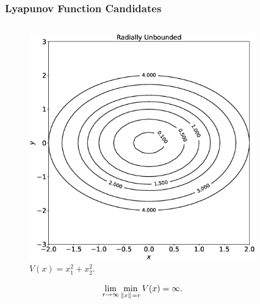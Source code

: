 \begin{frame}
    \frametitle{Lyapunov Function Candidates}

    \begin{columns}
        \begin{column}{0.5\textwidth}
            \begin{figure}[bth]
                \centering
                \includegraphics[width=1.0\textwidth]{figures/lyap_candidate_unbd.eps} 
                \caption{\footnotesize $V(x) = x_1^2 + x_2^2.$}
            \end{figure}
            \[ \lim_{r \to \infty} \min_{\|{x}\|_{{}_{}}=r} V(x) = \infty. \]
        \end{column}
        \begin{column}{0.5\textwidth}
            \begin{figure}[bth]
                \centering

\end{figure}
\end{column}
\end{columns}
\end{frame}
